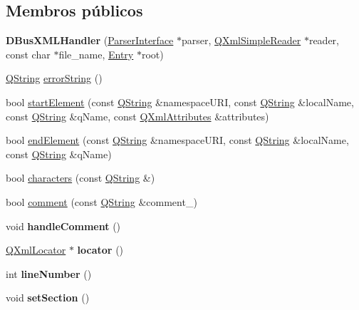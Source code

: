 \subsection*{Membros públicos}
\begin{DoxyCompactItemize}
\item 
\hypertarget{class_d_bus_x_m_l_handler_a14a76dd17c5b063a63dda3a3ebb20c1d}{{\bfseries D\-Bus\-X\-M\-L\-Handler} (\hyperlink{class_parser_interface}{Parser\-Interface} $\ast$parser, \hyperlink{class_q_xml_simple_reader}{Q\-Xml\-Simple\-Reader} $\ast$reader, const char $\ast$file\-\_\-name, \hyperlink{class_entry}{Entry} $\ast$root)}\label{class_d_bus_x_m_l_handler_a14a76dd17c5b063a63dda3a3ebb20c1d}

\item 
\hyperlink{class_q_string}{Q\-String} \hyperlink{class_d_bus_x_m_l_handler_af799a7684337babb971e2e0d8cda7cf1}{error\-String} ()
\item 
bool \hyperlink{class_d_bus_x_m_l_handler_a2d8a6efa278f0675843ac44ddec3b9b9}{start\-Element} (const \hyperlink{class_q_string}{Q\-String} \&namespace\-U\-R\-I, const \hyperlink{class_q_string}{Q\-String} \&local\-Name, const \hyperlink{class_q_string}{Q\-String} \&q\-Name, const \hyperlink{class_q_xml_attributes}{Q\-Xml\-Attributes} \&attributes)
\item 
bool \hyperlink{class_d_bus_x_m_l_handler_abd6ff9644b2d6f0a4aab938bd9cdc593}{end\-Element} (const \hyperlink{class_q_string}{Q\-String} \&namespace\-U\-R\-I, const \hyperlink{class_q_string}{Q\-String} \&local\-Name, const \hyperlink{class_q_string}{Q\-String} \&q\-Name)
\item 
bool \hyperlink{class_d_bus_x_m_l_handler_a4c0dc64e43b1a283cc948c82ff4ad392}{characters} (const \hyperlink{class_q_string}{Q\-String} \&)
\item 
bool \hyperlink{class_d_bus_x_m_l_handler_abe6e6b6cbb1913a33b7d1350b16e9bba}{comment} (const \hyperlink{class_q_string}{Q\-String} \&comment\-\_\-)
\item 
\hypertarget{class_d_bus_x_m_l_handler_a854cece148cf8dc514dc91e7d65e2035}{void {\bfseries handle\-Comment} ()}\label{class_d_bus_x_m_l_handler_a854cece148cf8dc514dc91e7d65e2035}

\item 
\hypertarget{class_d_bus_x_m_l_handler_ae3075792029d8ed95e26b527e305d7a2}{\hyperlink{class_q_xml_locator}{Q\-Xml\-Locator} $\ast$ {\bfseries locator} ()}\label{class_d_bus_x_m_l_handler_ae3075792029d8ed95e26b527e305d7a2}

\item 
\hypertarget{class_d_bus_x_m_l_handler_a4bc010d37f882a7895ca5b642dc65735}{int {\bfseries line\-Number} ()}\label{class_d_bus_x_m_l_handler_a4bc010d37f882a7895ca5b642dc65735}

\item 
\hypertarget{class_d_bus_x_m_l_handler_a1408bb8c3d78e622b9033fc7eb1b7ff6}{void {\bfseries set\-Section} ()}\label{class_d_bus_x_m_l_handler_a1408bb8c3d78e622b9033fc7eb1b7ff6}

\end{DoxyCompactItemize}


